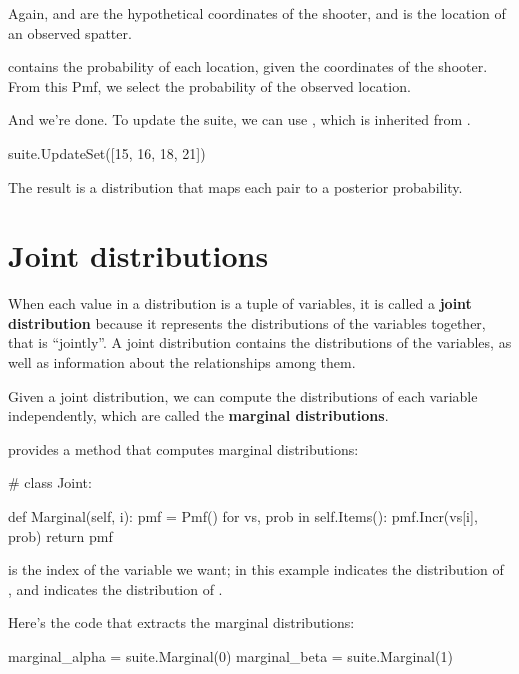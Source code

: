 \documentclass[12pt]{book}
\theoremstyle{exercise}
\begin{document}
Again,  and  are the hypothetical coordinates of
the shooter, and  is the location of an observed spatter.

 contains the probability of each location, given the
coordinates of the shooter.  From this Pmf, we select the probability
of the observed location.

And we're done.  To update the suite, we can use ,
which is inherited from .

\begin{code}
suite.UpdateSet([15, 16, 18, 21])
\end{code}

The result is a distribution that maps each  pair
to a posterior probability.


\section{Joint distributions}

When each value in a distribution is a tuple of variables, it is
called a {\bf joint distribution} because it represents the
distributions of the variables together, that is ``jointly''.
A joint distribution contains the distributions of the variables,
as well as information about the relationships among them.

Given a joint distribution, we can compute the distributions
of each variable independently, which are called the {\bf marginal
distributions}.

 provides a method that computes marginal
distributions:

\begin{code}
# class Joint:

    def Marginal(self, i):
        pmf = Pmf()
        for vs, prob in self.Items():
            pmf.Incr(vs[i], prob)
        return pmf
\end{code}

 is the index of the variable we want; in this example
 indicates the distribution of , and
 indicates the distribution of .

Here's the code that extracts the marginal distributions:

\begin{code}
    marginal_alpha = suite.Marginal(0)
    marginal_beta = suite.Marginal(1)
\end{code}
\end{document}
